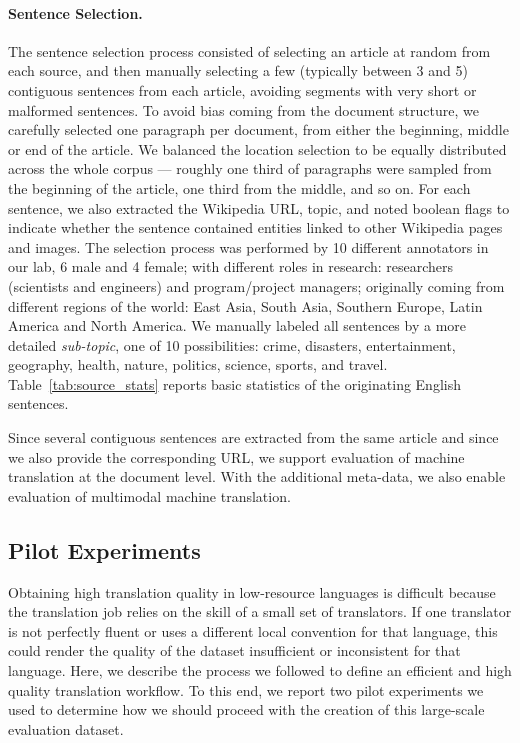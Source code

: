 \paragraph{Sentence Selection.} The sentence selection process consisted of selecting an article at random from each source, and then manually selecting a few (typically between 3 and 5) contiguous sentences from each article, avoiding segments with very short or malformed sentences. To avoid bias coming from the document structure, we carefully selected one paragraph per document, from either the beginning, middle or end of the article. We balanced the location selection to be equally distributed across the whole corpus --- roughly one third of paragraphs were sampled from the beginning of the article, one third from the middle, and so on. For each sentence, we also extracted the Wikipedia URL, topic, and noted boolean flags to indicate whether the sentence contained entities linked to other Wikipedia pages and images. The selection process was performed by 10 different annotators in our lab, 6 male and 4 female;  with different roles in research: researchers (scientists and engineers) and program/project managers; originally coming from different regions of the world: East Asia, South Asia, Southern Europe, Latin America and North America. We manually labeled all sentences by a more detailed \textit{sub-topic}, one of 10 possibilities: crime, disasters, entertainment, geography, health, nature, politics, science, sports, and travel. 
Table~\ref{tab:source_stats} reports basic statistics of the originating English sentences.

Since several contiguous sentences are extracted from the same article and since we also provide the corresponding URL, we support evaluation of machine translation at the document level. With the additional meta-data, we also enable evaluation of multimodal machine translation.

\subsection{Pilot Experiments}
\label{sec:pilot}

Obtaining high translation quality in low-resource languages is difficult because the translation job relies on the skill of a small set of translators. If one translator is not perfectly fluent or uses a different local convention for that language, this could render the quality of the dataset insufficient or inconsistent for that language. Here, we describe the process we followed to define an efficient and high quality translation workflow. To this end, we report two pilot experiments we used to determine how we should proceed with the creation of this large-scale evaluation dataset. 

